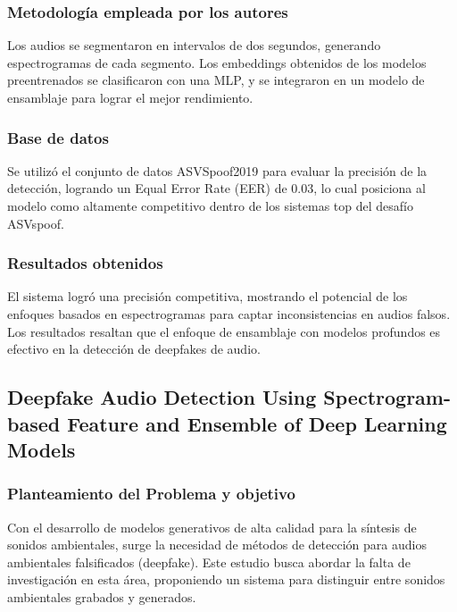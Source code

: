 \subsubsection{Metodología empleada por los autores}
Los audios se segmentaron en intervalos de dos segundos, generando espectrogramas de cada segmento. Los embeddings obtenidos de los modelos preentrenados se clasificaron con una MLP, y se integraron en un modelo de ensamblaje para lograr el mejor rendimiento.

\subsubsection{Base de datos}
Se utilizó el conjunto de datos ASVSpoof2019 para evaluar la precisión de la detección, logrando un Equal Error Rate (EER) de 0.03, lo cual posiciona al modelo como altamente competitivo dentro de los sistemas top del desafío ASVspoof.

\subsubsection{Resultados obtenidos}
El sistema logró una precisión competitiva, mostrando el potencial de los enfoques basados en espectrogramas para captar inconsistencias en audios falsos. Los resultados resaltan que el enfoque de ensamblaje con modelos profundos es efectivo en la detección de deepfakes de audio.

\subsection{Deepfake Audio Detection Using Spectrogram-based Feature and Ensemble of Deep Learning Models \citep*{pr_dehghani2018copper}}

\subsubsection{Planteamiento del Problema y objetivo }
Con el desarrollo de modelos generativos de alta calidad para la síntesis de sonidos ambientales, surge la necesidad de métodos de detección para audios ambientales falsificados (deepfake). Este estudio busca abordar la falta de investigación en esta área, proponiendo un sistema para distinguir entre sonidos ambientales grabados y generados.

